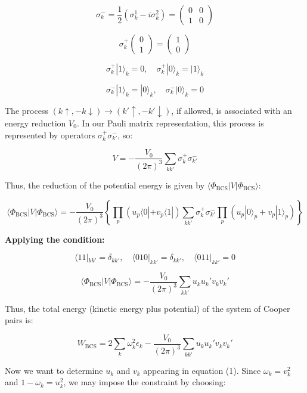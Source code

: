 \documentclass{article}
\begin{document}
\[
\sigma_k^- = \frac{1}{2} \left( \sigma_k^1 - i \sigma_k^2 \right) = \begin{pmatrix} 0 & 0 \\ 1 & 0 \end{pmatrix}
\]

\[
\sigma_k^+ \begin{pmatrix} 0 \\ 1 \end{pmatrix} = \begin{pmatrix} 1 \\ 0 \end{pmatrix}
\]

\[
\sigma_k^+ |1\rangle_k = 0, \quad \sigma_k^+ |0\rangle_k = |1\rangle_k
\]

\[
\sigma_k^- |1\rangle_k = |0\rangle_k, \quad \sigma_k^- |0\rangle_k = 0
\]

The process \( (k \uparrow, -k \downarrow) \rightarrow (k' \uparrow, -k' \downarrow) \), if allowed, is associated with an energy reduction \( V_0 \). In our Pauli matrix representation, this process is represented by operators \( \sigma_k^+ \sigma_{k'}^- \), so:

\[
V = - \frac{V_0}{(2\pi)^3} \sum_{k k'} \sigma_k^+ \sigma_{k'}^-
\]

Thus, the reduction of the potential energy is given by \( \langle \Phi_{\text{BCS}} | V | \Phi_{\text{BCS}} \rangle \):

\[
\langle \Phi_{\text{BCS}} | V | \Phi_{\text{BCS}} \rangle = - \frac{V_0}{(2\pi)^3} \left\{ \prod_p \left( u_p \langle 0 | + v_p \langle 1 | \right) \sum_{k k'} \sigma_k^+ \sigma_{k'}^- \prod_p \left( u_p |0\rangle_p + v_p |1\rangle_p \right) \right\}
\]

\textbf{Applying the condition:}

\[
\langle 1 1 |_{k k'} = \delta_{k k'}, \quad \langle 0 1 0 |_{k k'} = \delta_{k k'}, \quad \langle 0 1 1 |_{k k'} = 0
\]

\[
\langle \Phi_{\text{BCS}} | V | \Phi_{\text{BCS}} \rangle = -\frac{V_0}{(2\pi)^3} \sum_{k k'} u_k u_k' v_k v_k'
\]

Thus, the total energy (kinetic energy plus potential) of the system of Cooper pairs is:

\[
W_{\text{BCS}} = 2 \sum_k \omega_k^2 \epsilon_k - \frac{V_0}{(2\pi)^3} \sum_{k k'} u_k u_k' v_k v_k'
\]

Now we want to determine \( u_k \) and \( v_k \) appearing in equation (1). Since \( \omega_k = v_k^2 \) and \( 1 - \omega_k = u_k^2 \), we may impose the constraint by choosing:
\end{document}
